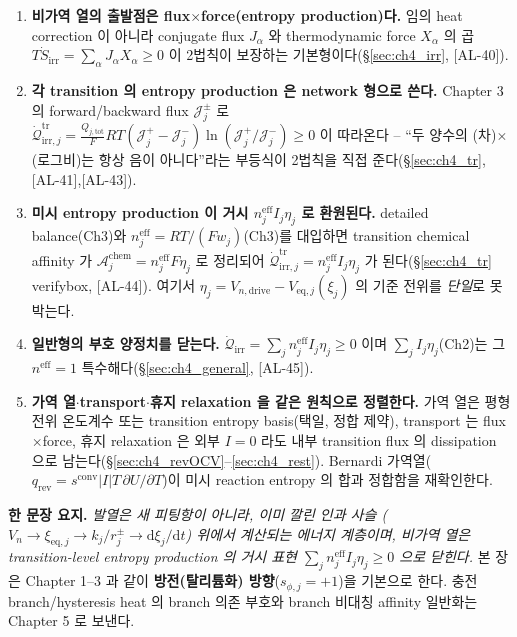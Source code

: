 \documentclass[11pt,a4paper]{article}
\newcommand{\dd}{\mathrm{d}}
\newcommand{\eff}{\mathrm{eff}}
\newcommand{\eq}{\mathrm{eq}}
\newcommand{\drive}{\mathrm{drive}}
\newcommand{\tot}{\mathrm{tot}}
\newcommand{\irr}{\mathrm{irr}}
\newcommand{\rev}{\mathrm{rev}}
\newcommand{\conv}{\mathrm{conv}}
\newcommand{\tr}{\mathrm{tr}}
\newcommand{\chem}{\mathrm{chem}}
\newcommand{\AL}[1]{\textsf{[AL-#1]}}
\begin{document}
\begin{enumerate}[label=\textbf{(\arabic*)},leftmargin=2.2em]
\item \textbf{비가역 열의 출발점은 flux$\times$force(entropy production)다.} 임의 heat correction 이 아니라
  conjugate flux $J_\alpha$ 와 thermodynamic force $X_\alpha$ 의 곱 $T\dot S_\irr=\sum_\alpha J_\alpha X_\alpha\ge0$
  이 2법칙이 보장하는 기본형이다(\S\ref{sec:ch4_irr}, \AL{40}).
\item \textbf{각 transition 의 entropy production 은 network 형으로 쓴다.} Chapter 3 의 forward/backward
  flux $\mathcal J_j^\pm$ 로 $\dot{\mathcal Q}_{\irr,j}^{\tr}=\tfrac{Q_{j,\tot}}{F}RT(\mathcal J_j^+-\mathcal J_j^-)
  \ln(\mathcal J_j^+/\mathcal J_j^-)\ge0$ 이 따라온다 -- ``두 양수의 (차)$\times$(로그비)는 항상 음이 아니다''라는
  부등식이 2법칙을 직접 준다(\S\ref{sec:ch4_tr}, \AL{41},\AL{43}).
\item \textbf{미시 entropy production 이 거시 $n_j^{\eff}I_j\eta_j$ 로 환원된다.} detailed balance(Ch3)와
  $n_j^{\eff}=RT/(Fw_j)$(Ch3)를 대입하면 transition chemical affinity 가 $\mathcal A_j^{\chem}=n_j^{\eff}F\eta_j$
  로 정리되어 $\dot{\mathcal Q}_{\irr,j}^{\tr}=n_j^{\eff}I_j\eta_j$ 가 된다(\S\ref{sec:ch4_tr} verifybox,
  \AL{44}). 여기서 $\eta_j=V_{n,\drive}-V_{\eq,j}(\xi_j)$ 의 기준 전위를 \emph{단일}로 못박는다.
\item \textbf{일반형의 부호 양정치를 닫는다.} $\dot{\mathcal Q}_\irr=\sum_j n_j^{\eff}I_j\eta_j\ge0$ 이며
  $\sum_j I_j\eta_j$(Ch2)는 그 $n^{\eff}=1$ 특수해다(\S\ref{sec:ch4_general}, \AL{45}).
\item \textbf{가역 열$\cdot$transport$\cdot$휴지 relaxation 을 같은 원칙으로 정렬한다.} 가역 열은 평형 전위
  온도계수 또는 transition entropy basis(택일, 정합 제약), transport 는 flux$\times$force, 휴지 relaxation 은
  외부 $I=0$ 라도 내부 transition flux 의 dissipation 으로 남는다(\S\ref{sec:ch4_revOCV}--\ref{sec:ch4_rest}).
  Bernardi 가역열($q_\rev=s^\conv|I|T\,\partial U/\partial T$)이 미시 reaction entropy 의 합과 정합함을
  재확인한다.
\end{enumerate}

\noindent\textbf{한 문장 요지.} \emph{발열은 새 피팅항이 아니라, 이미 깔린 인과 사슬
($V_n\to\xi_{\eq,j}\to k_j/r_j^\pm\to\dd\xi_j/\dd t$) 위에서 계산되는 에너지 계층이며, 비가역 열은
transition-level entropy production 의 거시 표현 $\sum_j n_j^{\eff}I_j\eta_j\ge0$ 으로 닫힌다.} 본 장은
Chapter 1--3 과 같이 \textbf{방전(탈리튬화) 방향}($s_{\phi,j}=+1$)을 기본으로 한다. 충전 branch/hysteresis
heat 의 branch 의존 부호와 branch 비대칭 affinity 일반화는 Chapter 5 로 보낸다.
\end{document}
